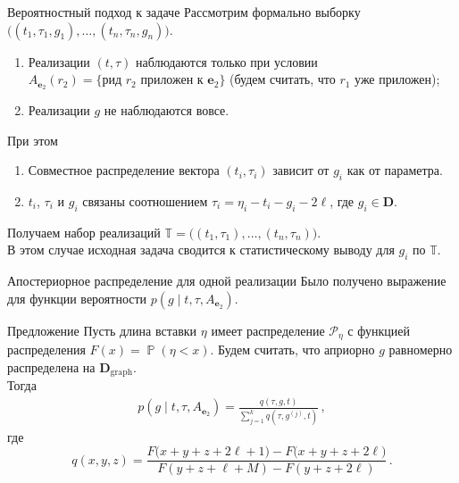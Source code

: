 \documentclass[unicode, notheorems]{beamer}
\DeclareMathOperator{\Prb}{\mathbb{P}}
\begin{document}
\begin{frame}{Вероятностный подход к задаче}
	Рассмотрим формально выборку $\Big( (t_1, \tau_1, g_1), \ldots, (t_n, \tau_n, g_n) \Big)$.
	\begin{enumerate}
		\item Реализации $(t, \tau)$ наблюдаются только при условии $A_{\mathbf{e}_2}(r_2) = \{\text{рид } r_2 \text{ приложен к } \mathbf{e}_2\}$ (будем считать, что $r_1$ уже приложен);
		\item Реализации $g$ не наблюдаются вовсе.
	\end{enumerate}
	\smallskip
	При этом
	\begin{enumerate}
		\item Совместное распределение вектора $(t_i, \tau_i)$ зависит от $g_i$ как от параметра.
		\item $t_i$, $\tau_i$ и $g_i$ связаны соотношением $\tau_i = \eta_i - t_i - g_i - 2\ell$, где $g_i  \in \mathbf{D}$.
	\end{enumerate}
	\smallskip
	Получаем набор реализаций $\mathbb{T} = \Big( (t_1, \tau_1), \ldots, (t_n, \tau_n) \Big)$.\\
	\medskip
	{\color{blue} В этом случае исходная задача сводится к статистическому выводу для $g_i$ по $\mathbb{T}$.}
\end{frame}

\begin{frame}{Апостериорное распределение для одной реализации}
Было получено выражение для функции вероятности $p(g \mid t, \tau, A_{\mathbf{e}_2})$.
\begin{block}{Предложение}
	Пусть длина вставки $\eta$ имеет распределение $\mathcal{P}_\eta$ с функцией распределения $F(x) = \Prb(\eta < x)$. Будем считать, что априорно $g$ равномерно распределена на $\mathbf{D}_{\mathrm{graph}}$.\\
	\medskip
	Тогда
	\begin{equation*}
	\begin{gathered}
	p(g \mid t, \tau,  A_{\mathbf{e}_2}) =  \frac{q(\tau, g, t)}{\sum_{j=1}^k q(\tau, g^{(j)}, t)}	\,,
	\end{gathered}
	\end{equation*}
	где
	\begin{equation*}
		q(x, y, z)  = \frac{F\big(x+y+z+2\ell+1\big) - F\big(x+y+z+2\ell\big)}{F( y + z + \ell + M) - F(y + z + 2\ell)}\,.
	\end{equation*}
\end{block}
\end{frame}
\end{document}
